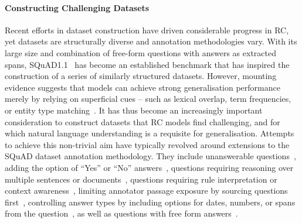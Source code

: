 \documentclass[11pt,a4paper]{article}
\newcommand{\squad}{SQuAD}
\newcommand{\squadone}{SQuAD1.1}
\begin{document}
\paragraph{Constructing Challenging Datasets}{
Recent efforts in dataset construction have driven considerable progress in RC, yet datasets are structurally diverse and annotation methodologies vary.
With its large size and combination of free-form questions with answers as extracted spans, \squadone{}~\cite{rajpurkar2016squad} has become an established benchmark that has inspired the construction of a series of similarly structured datasets. 
However, mounting evidence suggests that models can achieve strong generalisation performance merely by relying on superficial cues -- such as lexical overlap, term frequencies, or entity type matching~\cite{chen-etal-2016-thorough, weissenborn-etal-2017-making, sugawara-etal-2018-makes}.
It has thus become an increasingly important consideration to construct datasets that RC models find challenging, and for which natural language understanding is a requisite for generalisation.
Attempts to achieve this non-trivial aim have typically revolved around extensions to the \squad{} dataset annotation methodology. 
They include unanswerable questions~\cite{trischler-etal-2017-newsqa, rajpurkar-etal-2018-know, reddy-etal-2019-coqa, choi-etal-2018-quac}, adding the option of ``Yes'' or ``No'' answers~\cite{dua2019drop, kwiatkowski-etal-2019-natural}, questions requiring reasoning over multiple sentences or documents~\cite{welbl2018constructing, yang2018hotpotqa}, questions requiring rule interpretation or context awareness~\cite{saeidi-etal-2018-interpretation, choi-etal-2018-quac, reddy-etal-2019-coqa}, limiting annotator passage exposure by sourcing questions first~\cite{kwiatkowski-etal-2019-natural}, controlling answer types by including options for dates, numbers, or spans from the question~\cite{dua2019drop}, as well as questions with free form answers~\cite{nguyen2016ms, kocisky2018narrativeqa, reddy-etal-2019-coqa}.
}
\end{document}
